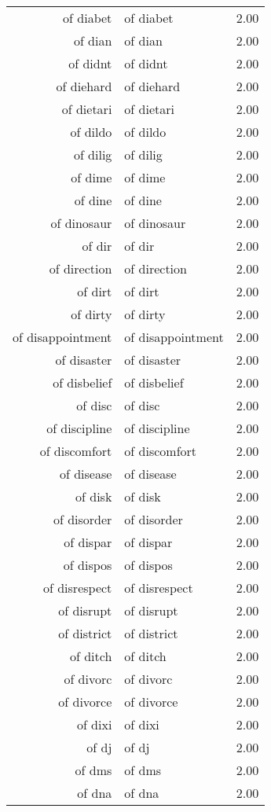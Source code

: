 \begin{table}[ht]
\begin{tabular}{rlr}
  of diabet & of diabet & 2.00 \\ 
  of dian & of dian & 2.00 \\ 
  of didnt & of didnt & 2.00 \\ 
  of diehard & of diehard & 2.00 \\ 
  of dietari & of dietari & 2.00 \\ 
  of dildo & of dildo & 2.00 \\ 
  of dilig & of dilig & 2.00 \\ 
  of dime & of dime & 2.00 \\ 
  of dine & of dine & 2.00 \\ 
  of dinosaur & of dinosaur & 2.00 \\ 
  of dir & of dir & 2.00 \\ 
  of direction & of direction & 2.00 \\ 
  of dirt & of dirt & 2.00 \\ 
  of dirty & of dirty & 2.00 \\ 
  of disappointment & of disappointment & 2.00 \\ 
  of disaster & of disaster & 2.00 \\ 
  of disbelief & of disbelief & 2.00 \\ 
  of disc & of disc & 2.00 \\ 
  of discipline & of discipline & 2.00 \\ 
  of discomfort & of discomfort & 2.00 \\ 
  of disease & of disease & 2.00 \\ 
  of disk & of disk & 2.00 \\ 
  of disorder & of disorder & 2.00 \\ 
  of dispar & of dispar & 2.00 \\ 
  of dispos & of dispos & 2.00 \\ 
  of disrespect & of disrespect & 2.00 \\ 
  of disrupt & of disrupt & 2.00 \\ 
  of district & of district & 2.00 \\ 
  of ditch & of ditch & 2.00 \\ 
  of divorc & of divorc & 2.00 \\ 
  of divorce & of divorce & 2.00 \\ 
  of dixi & of dixi & 2.00 \\ 
  of dj & of dj & 2.00 \\ 
  of dms & of dms & 2.00 \\ 
  of dna & of dna & 2.00 \\ 

\end{tabular}
\end{table}
